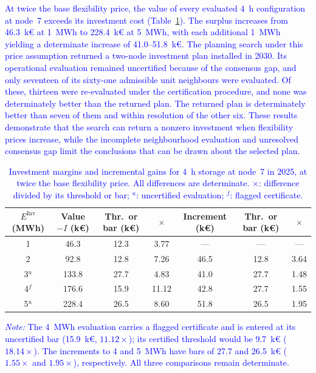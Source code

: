 \documentclass[preprint,12pt]{elsarticle}
\begin{document}
\textcolor{blue}{
    At twice the base flexibility price, the value of every evaluated 4~h configuration at node~7 exceeds its investment cost (Table~\ref{tab:res_energy_ladder_m2}). The surplus increases from 46.3~k\euro{} at 1~MWh to 228.4~k\euro{} at 5~MWh, with each additional 1~MWh yielding a determinate increase of 41.0--51.8~k\euro{}. The planning search under this price assumption returned a two-node investment plan installed in 2030. Its operational evaluation remained uncertified because of the consensus gap, and only seventeen of its sixty-one admissible unit neighbours were evaluated. Of these, thirteen were re-evaluated under the certification procedure, and none was determinately better than the returned plan. The returned plan is determinately better than seven of them and within resolution of the other six.
    These results demonstrate that the search can return a nonzero investment when flexibility prices increase, while the incomplete neighbourhood evaluation and unresolved consensus gap limit the conclusions that can be drawn about the selected plan.
}

\begin{table}[htbp!]
    \centering
    \caption{\textcolor{blue}{Investment margins and incremental gains for 4~h storage at node~7 in 2025, at twice the base flexibility price. All differences are determinate. $\times$: difference divided by its threshold or bar; $^{u}$: uncertified evaluation; $^{f}$: flagged certificate.}}
    \label{tab:res_energy_ladder_m2}
    \scriptsize\setlength{\tabcolsep}{4pt}
    \begin{tabular}{c c c c c c c}
        \toprule
        $E^{\text{Inv}}$ (MWh) & Value $- I$ (k\euro) & Thr.\ or bar (k\euro) & $\times$ & Increment (k\euro) & Thr.\ or bar (k\euro) & $\times$ \\
        \midrule
        1         & 46.3  & 12.3 & 3.77  & ---  & ---  & ---  \\
        2         & 92.8  & 12.8 & 7.26  & 46.5 & 12.8 & 3.64 \\
        3$^{u}$   & 133.8 & 27.7 & 4.83  & 41.0 & 27.7 & 1.48 \\
        4$^{f}$   & 176.6 & 15.9 & 11.12 & 42.8 & 27.7 & 1.55 \\
        5$^{u}$   & 228.4 & 26.5 & 8.60  & 51.8 & 26.5 & 1.95 \\
        \bottomrule
    \end{tabular}
    \par\smallskip
    \begin{minipage}{\linewidth}
        \scriptsize
        \raggedright
        \textcolor{blue}{%
            \textit{Note:} The 4~MWh evaluation carries a flagged certificate and is entered at its uncertified bar (15.9~k\euro{}, $11.12\times$); its certified threshold would be 9.7~k\euro{} ($18.14\times$).
            The increments to 4 and 5~MWh have bars of 27.7 and 26.5~k\euro{} ($1.55\times$ and $1.95\times$), respectively. All three comparisons remain determinate.
        }
    \end{minipage}
\end{table}
\end{document}
